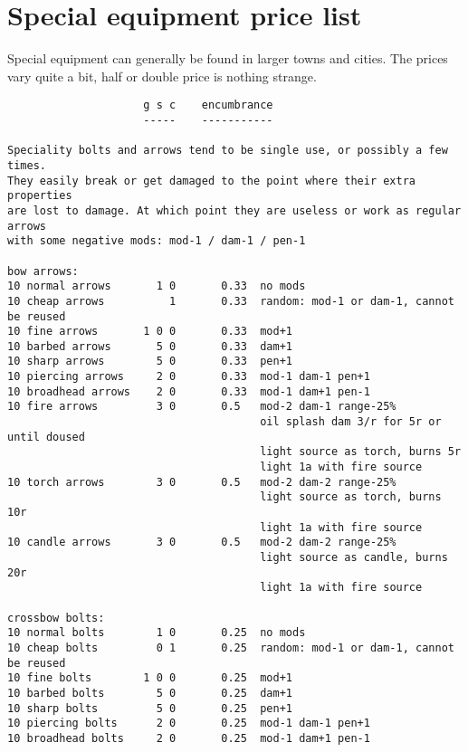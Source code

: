 
\goodbreak
{}
\section*{Special equipment price list}

Special equipment can generally be found in larger towns and cities.
The prices vary quite a bit, half or double price is nothing strange.

\small
\begin{verbatim}
                     g s c    encumbrance
                     -----    -----------

Speciality bolts and arrows tend to be single use, or possibly a few times.
They easily break or get damaged to the point where their extra properties
are lost to damage. At which point they are useless or work as regular arrows
with some negative mods: mod-1 / dam-1 / pen-1

bow arrows:
10 normal arrows       1 0       0.33  no mods
10 cheap arrows          1       0.33  random: mod-1 or dam-1, cannot be reused
10 fine arrows       1 0 0       0.33  mod+1
10 barbed arrows       5 0       0.33  dam+1
10 sharp arrows        5 0       0.33  pen+1
10 piercing arrows     2 0       0.33  mod-1 dam-1 pen+1
10 broadhead arrows    2 0       0.33  mod-1 dam+1 pen-1
10 fire arrows         3 0       0.5   mod-2 dam-1 range-25%
                                       oil splash dam 3/r for 5r or until doused
                                       light source as torch, burns 5r
                                       light 1a with fire source
10 torch arrows        3 0       0.5   mod-2 dam-2 range-25%
                                       light source as torch, burns 10r
                                       light 1a with fire source
10 candle arrows       3 0       0.5   mod-2 dam-2 range-25%
                                       light source as candle, burns 20r
                                       light 1a with fire source

crossbow bolts:
10 normal bolts        1 0       0.25  no mods
10 cheap bolts         0 1       0.25  random: mod-1 or dam-1, cannot be reused
10 fine bolts        1 0 0       0.25  mod+1
10 barbed bolts        5 0       0.25  dam+1
10 sharp bolts         5 0       0.25  pen+1
10 piercing bolts      2 0       0.25  mod-1 dam-1 pen+1
10 broadhead bolts     2 0       0.25  mod-1 dam+1 pen-1


\end{verbatim}
